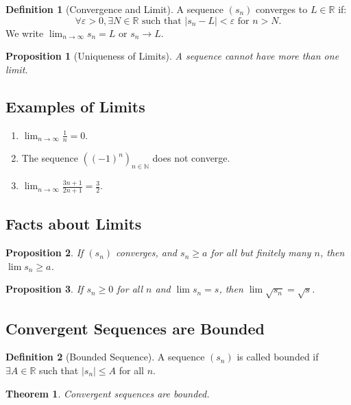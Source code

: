 \documentclass[9pt]{article}
\theoremstyle{definition}
\newtheorem{definition}{Definition}
\theoremstyle{plain}
\newtheorem{theorem}{Theorem}
\newtheorem{proposition}{Proposition}
\begin{document}
\begin{definition}[Convergence and Limit]
A sequence \( (s_n) \) converges to \( L \in \mathbb{R} \) if:
\[
\forall \varepsilon > 0, \exists N \in \mathbb{R} \text{ such that } |s_n - L| < \varepsilon \text{ for } n > N.
\]
We write \( \lim_{n \to \infty} s_n = L \) or \( s_n \to L \).
\end{definition}

\begin{proposition}[Uniqueness of Limits]
A sequence cannot have more than one limit.
\end{proposition}

\subsection*{Examples of Limits}
\begin{enumerate}[label=\arabic*.]
    \item \( \lim_{n \to \infty} \frac{1}{n} = 0 \).
    \item The sequence \( ((-1)^n)_{n \in \mathbb{N}} \) does not converge.
    \item \( \lim_{n \to \infty} \frac{3n + 1}{2n + 1} = \frac{3}{2} \).
\end{enumerate}

\subsection*{Facts about Limits}
\begin{proposition}
If \( (s_n) \) converges, and \( s_n \geq a \) for all but finitely many \( n \), then \( \lim s_n \geq a \).
\end{proposition}

\begin{proposition}
If \( s_n \geq 0 \) for all \( n \) and \( \lim s_n = s \), then \( \lim \sqrt{s_n} = \sqrt{s} \).
\end{proposition}

\subsection*{Convergent Sequences are Bounded}
\begin{definition}[Bounded Sequence]
A sequence \( (s_n) \) is called bounded if \( \exists A \in \mathbb{R} \) such that \( |s_n| \leq A \) for all \( n \).
\end{definition}

\begin{theorem}
Convergent sequences are bounded.
\end{theorem}
\end{document}
